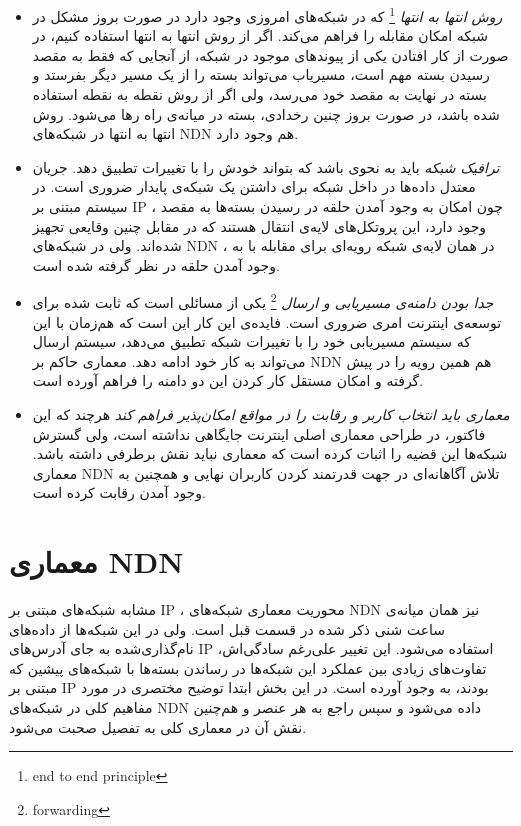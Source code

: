 \begin{itemize}
{}

\item{
\textit{روش انتها به انتها}
\footnote{end to end principle}
 \cite{end2end}
 که در شبکه‌های امروزی وجود دارد در صورت بروز مشکل در شبکه امکان مقابله را فراهم می‌کند. اگر از روش انتها به انتها استفاده کنیم، در صورت از کار افتادن یکی از پیوندهای موجود در شبکه، از ‌آنجایی که فقط به مقصد رسیدن بسته مهم است، مسیریاب می‌تواند بسته را از یک مسیر دیگر بفرستد و بسته در نهایت به مقصد خود می‌رسد، ولی اگر از روش نقطه به نقطه استفاده شده باشد، در صورت بروز چنین رخدادی، بسته در میانه‌ی راه رها می‌شود. روش انتها به انتها در شبکه‌های NDN هم وجود دارد. 
}

\item{
\textit{ترافیک شبکه}
باید به نحوی باشد که بتواند خودش را با تغییرات تطبیق دهد. جریان معتدل داده‌ها در داخل شبکه برای داشتن یک شبکه‌ی پایدار ضروری است. در سیستم مبتنی بر IP ، چون امکان به وجود آمدن حلقه در رسیدن بسته‌ها به مقصد وجود دارد، این پروتکل‌های لایه‌ی انتقال هستند که در مقابل چنین وقایعی تجهیز شده‌اند. ولی در شبکه‌‌های NDN ، در همان لایه‌ی شبکه رویه‌ای برای مقابله با به وجود آمدن حلقه در نظر گرفته شده است. 
}
\item{
\textit{جدا بودن دامنه‌ی مسیریابی و ارسال}
\footnote{forwarding}
یکی از مسائلی است که ثابت شده برای توسعه‌ی اینترنت امری ضروری است. فایده‌ی این کار این است که هم‌زمان با این که سیستم مسیریابی خود را با تغییرات شبکه تطبیق می‌دهد، سیستم ارسال می‌تواند به کار خود ادامه دهد.  معماری حاکم بر NDN هم همین رویه را در پیش گرفته و امکان مستقل کار کردن این دو دامنه را فراهم ‌آورده است. 
}

\item{
\textit{ معماری باید انتخاب کاربر و رقابت را در مواقع امکان‌پذیر فراهم کند }
هرچند که این فاکتور، در طراحی معماری اصلی اینترنت جایگاهی نداشته است، ولی گسترش شبکه‌ها این قضیه را اثبات کرده است که معماری نباید نقش برطرفی داشته باشد. معماری NDN تلاش آگاهانه‌ای در جهت قدرتمند کردن کاربران نهایی و همچنین به وجود آمدن رقابت کرده است. 
\cite{clark2002tussle}
}

\end{itemize}

\section{معماری NDN}
مشابه شبکه‌های مبتنی بر IP ، محوریت معماری شبکه‌های NDN نیز همان میانه‌ی ساعت شنی ذکر شده در قسمت قبل است. ولی در این شبکه‌ها از داده‌‌های نام‌گذاری‌شده به جای آدرس‌های IP استفاده می‌‌شود. این تغییر علی‌رغم سادگی‌اش، تفاوت‌های زیادی بین عملکرد این شبکه‌ها در رساندن بسته‌ها با شبکه‌های پیشین که مبتنی بر IP بودند، به وجود آورده است.  در این بخش ابتدا توضیح مختصری در مورد مفاهیم کلی در شبکه‌های NDN داده می‌شود و سپس راجع به هر عنصر و هم‌چنین نقش آن در معماری کلی به تفصیل صحبت می‌شود. 

